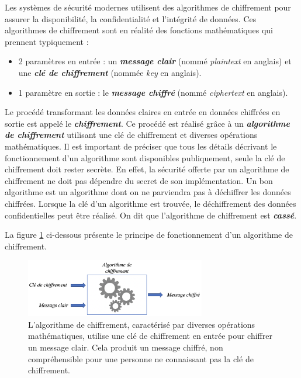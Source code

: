 \documentclass[10pt, oneside, a4paper]{article}
\begin{document}
Les systèmes de sécurité modernes utilisent des algorithmes de chiffrement pour assurer la disponibilité, la confidentialité et l'intégrité de données. Ces algorithmes de chiffrement sont en réalité des fonctions mathématiques qui prennent typiquement : 
\begin{itemize}
\item  2 paramètres en entrée : un \textbf{\textit{message clair}} (nommé \textit{plaintext} en anglais) et une \textbf{\textit{clé de chiffrement}} (nommée \textit{key} en anglais).
\item 1 paramètre en sortie : le \textbf{\textit{message chiffré}} (nommé \textit{ciphertext} en anglais). \\
\end{itemize}
Le procédé transformant les données claires en entrée en données chiffrées en sortie est appelé le \textbf{\textit{chiffrement}}.
Ce procédé est réalisé grâce à un \textbf{\textit{algorithme de chiffrement}} utilisant une clé de chiffrement et diverses opérations mathématiques. Il est important de préciser que tous les détails décrivant le fonctionnement d'un algorithme sont disponibles publiquement, seule la clé de chiffrement doit rester secrète. En effet, la sécurité offerte par un algorithme de chiffrement ne doit pas dépendre du secret de son implémentation. Un bon algorithme est un algorithme dont on ne parviendra pas à déchiffrer les données chiffrées. Lorsque la clé d'un algorithme est trouvée, le déchiffrement des données confidentielles peut être réalisé. On dit que l'algorithme de chiffrement est \textbf{\textit{cassé}}.

\hspace{-0.5 cm}La figure \ref{fig:chiffrement} ci-dessous présente le principe de fonctionnement d'un algorithme de chiffrement.

\begin{figure}[htbp]
    \centering
    \includegraphics[width=0.7\textwidth]{image/chiffrement}
    \caption{L'algorithme de chiffrement, caractérisé par diverses opérations mathématiques, utilise une clé de chiffrement en entrée pour chiffrer un message clair. Cela produit un message chiffré, non compréhensible pour une personne ne connaissant pas la clé de chiffrement.}
    \label{fig:chiffrement}
\end{figure}
\end{document}
